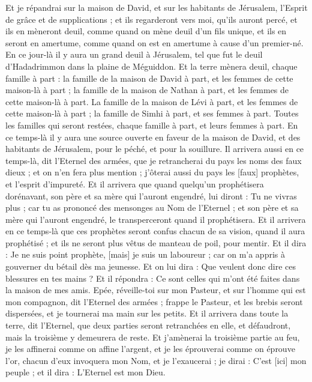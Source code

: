 \begin{multicols}{2}
Et je répandrai sur la maison de David, et sur les habitants de Jérusalem, l'Esprit de grâce et de supplications ; et ils regarderont vers moi, qu'ils auront percé, et ils en mèneront deuil, comme quand on mène deuil d'un fils unique, et ils en seront en amertume, comme quand on est en amertume à cause d'un premier-né.
En ce jour-là il y aura un grand deuil à Jérusalem, tel que fut le deuil d'Hadadrimmon dans la plaine de Méguiddon.
Et la terre mènera deuil, chaque famille à part : la famille de la maison de David à part, et les femmes de cette maison-là à part ; la famille de la maison de Nathan à part, et les femmes de cette maison-là à part.
La famille de la maison de Lévi à part, et les femmes de cette maison-là à part ; la famille de Simhi à part, et ses femmes à part.
Toutes les familles qui seront restées, chaque famille à part, et leurs femmes à part.
\VerseOne{}En ce temps-là il y aura une source ouverte en faveur de la maison de David, et des habitants de Jérusalem, pour le péché, et pour la souillure.
Il arrivera aussi en ce temps-là, dit l'Eternel des armées, que je retrancherai du pays les noms des faux dieux ; et on n'en fera plus mention ; j'ôterai aussi du pays les [faux] prophètes, et l'esprit d'impureté.
Et il arrivera que quand quelqu'un prophétisera dorénavant, son père et sa mère qui l'auront engendré, lui diront : Tu ne vivras plus ; car tu as prononcé des mensonges au Nom de l'Eternel ; et son père et sa mère qui l'auront engendré, le transperceront quand il prophétisera.
Et il arrivera en ce temps-là que ces prophètes seront confus chacun de sa vision, quand il aura prophétisé ; et ils ne seront plus vêtus de manteau de poil, pour mentir.
Et il dira : Je ne suis point prophète, [mais] je suis un laboureur ; car on m'a appris à gouverner du bétail dès ma jeunesse.
Et on lui dira : Que veulent donc dire ces blessures en tes mains ? Et il répondra : Ce sont celles qui m'ont été faites dans la maison de mes amis.
Epée, réveille-toi sur mon Pasteur, et sur l'homme qui est mon compagnon, dit l'Eternel des armées ; frappe le Pasteur, et les brebis seront dispersées, et je tournerai ma main sur les petits.
Et il arrivera dans toute la terre, dit l'Eternel, que deux parties seront retranchées en elle, et défaudront, mais la troisième y demeurera de reste.
Et j'amènerai la troisième partie au feu, je les affinerai comme on affine l'argent, et je les éprouverai comme on éprouve l'or, chacun d'eux invoquera mon Nom, et je l'exaucerai ; je dirai : C'est [ici] mon peuple ; et il dira : L'Eternel est mon Dieu.

\end{multicols}
